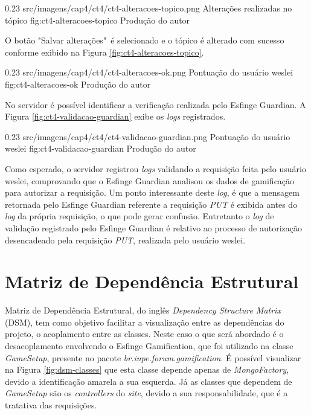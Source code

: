 \begin{image}
{0.23}
{src/imagens/cap4/ct4/ct4-alteracoes-topico.png}
{Alterações realizadas no tópico}
{fig:ct4-alteracoes-topico}
{Produção do autor}
\end{image}

\par O botão "Salvar alterações"\ é selecionado e o tópico é alterado com sucesso conforme exibido na Figura \ref{fig:ct4-alteracoes-topico}.

\begin{image}
{0.23}
{src/imagens/cap4/ct4/ct4-alteracoes-ok.png}
{Pontuação do usuário weslei}
{fig:ct4-alteracoes-ok}
{Produção do autor}
\end{image}

\par No servidor é possível identificar a verificação realizada pelo Esfinge Guardian. A Figura \ref{fig:ct4-validacao-guardian} exibe os \textit{logs} registrados.

\begin{image}
{0.23}
{src/imagens/cap4/ct4/ct4-validacao-guardian.png}
{Pontuação do usuário weslei}
{fig:ct4-validacao-guardian}
{Produção do autor}
\end{image}

\par Como esperado, o servidor registrou \textit{logs} validando a requisição feita pelo usuário weslei, comprovando que o Esfinge Guardian analisou os dados de gamificação para autorizar a requisição. Um ponto interessante deste \textit{log}, é que a mensagem retornada pelo Esfinge Guardian referente a requisição \textit{PUT} é exibida antes do \textit{log} da própria requisição, o que pode gerar confusão. Entretanto o \textit{log} de validação registrado pelo Esfinge Guardian é relativo ao processo de autorização desencadeado pela requisição \textit{PUT}, realizada pelo usuário weslei.

\section{Matriz de Dependência Estrutural}

\par Matriz de Dependência Estrutural, do inglês \textit{Dependency Structure Matrix} (DSM), tem como objetivo facilitar a visualização entre as dependências do projeto, o acoplamento entre as classes. Neste caso o que será abordado é o desacoplamento envolvendo o Esfinge Gamification, que foi utilizado na classe \textit{GameSetup}, presente no pacote \textit{br.inpe.forum.gamification}. É possível visualizar na Figura \ref{fig:dsm-classes} que esta classe depende apenas de \textit{MongoFactory}, devido a identificação amarela a sua esquerda. Já as classes que dependem de \textit{GameSetup} são os \textit{controllers} do \textit{site}, devido a sua responsabilidade, que é a tratativa das requisições.

